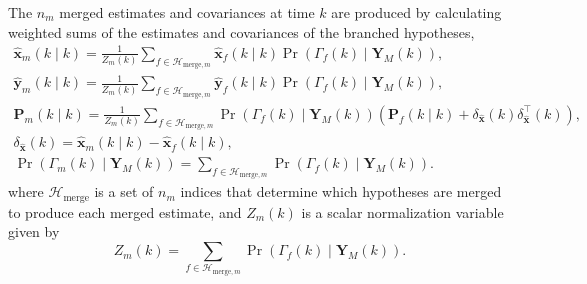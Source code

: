 {The $n_m$ merged estimates and covariances at time $k$ are produced by calculating weighted sums of the estimates and covariances of the branched hypotheses,
%
%
%
%
%
\begin{equation} \label{eq:xmkymk_hat_MKF}
	\begin{aligned}
		\mathbf{\hat{x}}_m(k \mid k) = \frac{1}{Z_m(k)} \sum_{f \in \mathcal{H}_{\text{merge},m}} \mathbf{\hat{x}}_f(k \mid k) \Pr(\Gamma_f(k) \mid \mathbf{Y}_M(k)), \\
		\mathbf{\hat{y}}_m(k \mid k) = \frac{1}{Z_m(k)} \sum_{f \in \mathcal{H}_{\text{merge},m}} \mathbf{\hat{y}}_f(k \mid k) \Pr(\Gamma_f(k) \mid \mathbf{Y}_M(k)),\\
		\mathbf{P}_m(k \mid k) = \frac{1}{Z_m(k)} \sum_{f \in \mathcal{H}_{\text{merge},m}} \Pr(\Gamma_f(k) \mid \mathbf{Y}_M(k)) \left( \mathbf{P}_f(k \mid k) + \delta_\mathbf{\hat{x}}(k) \delta_\mathbf{\hat{x}}^\intercal(k) \right), \\
		\delta_\mathbf{\hat{x}}(k) = \mathbf{\hat{x}}_m(k \mid k) - \mathbf{\hat{x}}_f(k \mid k), \\
		\Pr(\Gamma_m(k) \mid \mathbf{Y}_M(k)) = \sum_{f \in \mathcal{H}_{\text{merge},m}} \Pr(\Gamma_f(k) \mid \mathbf{Y}_M(k)).
	\end{aligned}
\end{equation}
%
where $\mathcal{H}_{\text{merge}}$ is a set of $n_m$ indices that determine which hypotheses are merged to produce each merged estimate, and $Z_m(k)$ is a scalar normalization variable given by
%
\begin{equation} \label{eq:Zmk}
	Z_m(k) = \sum_{f \in \mathcal{H}_{\text{merge},m}} \Pr(\Gamma_f(k) \mid \mathbf{Y}_M(k)).
\end{equation}

}
